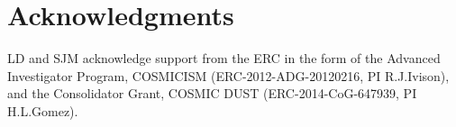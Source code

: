 \documentclass[useAMS,usenatbib]{mn2e}
\def\mic{ $\mu $m\,}
\begin{document}

\section*{Acknowledgments}

LD and SJM acknowledge support from the ERC in the form of the
Advanced Investigator Program, COSMICISM (ERC-2012-ADG-20120216, PI
R.J.Ivison), and the Consolidator Grant, COSMIC DUST
(ERC-2014-CoG-647939, PI H.L.Gomez). 
\end{document}
